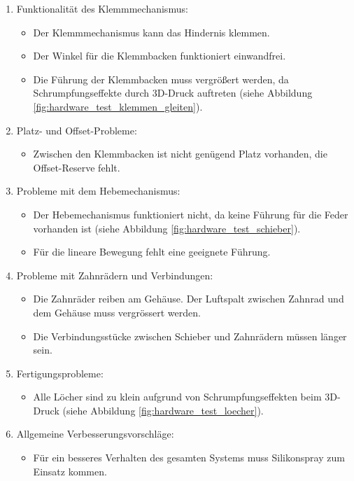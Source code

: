 \documentclass[../main.tex]{subfiles}
\begin{document}
\begin{enumerate}
    \item Funktionalität des Klemmmechanismus:
    \begin{itemize}
        \item Der Klemmmechanismus kann das Hindernis klemmen.
        \item Der Winkel für die Klemmbacken funktioniert einwandfrei.
        \item Die Führung der Klemmbacken muss vergrößert werden, da Schrumpfungseffekte durch 3D-Druck auftreten (siehe Abbildung \ref{fig:hardware_test_klemmen_gleiten}).
    \end{itemize}
    \item Platz- und Offset-Probleme:
    \begin{itemize}
        \item Zwischen den Klemmbacken ist nicht genügend Platz vorhanden, die Offset-Reserve fehlt.
    \end{itemize}
    \item Probleme mit dem Hebemechanismus:
    \begin{itemize}
        \item Der Hebemechanismus funktioniert nicht, da keine Führung für die Feder vorhanden ist (siehe Abbildung \ref{fig:hardware_test_schieber}).
        \item Für die lineare Bewegung fehlt eine geeignete Führung.
    \end{itemize}
    \item Probleme mit Zahnrädern und Verbindungen:
    \begin{itemize}
        \item Die Zahnräder reiben am Gehäuse. Der Luftspalt zwischen Zahnrad und dem Gehäuse muss vergrössert werden.
        \item Die Verbindungsstücke zwischen Schieber und Zahnrädern müssen länger sein.
    \end{itemize}
    \item Fertigungsprobleme:
    \begin{itemize}
        \item Alle Löcher sind zu klein aufgrund von Schrumpfungseffekten beim 3D-Druck (siehe Abbildung \ref{fig:hardware_test_loecher}).
    \end{itemize}
    \item Allgemeine Verbesserungsvorschläge:
    \begin{itemize}
        \item Für ein besseres Verhalten des gesamten Systems muss Silikonspray zum Einsatz kommen.
    \end{itemize}
\end{enumerate}
\end{document}
